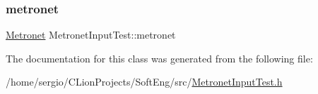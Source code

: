 \subsubsection{\texorpdfstring{metronet}{metronet}}
{\footnotesize\ttfamily \hyperlink{class_metronet}{Metronet} Metronet\+Input\+Test\+::metronet\hspace{0.3cm}{\ttfamily [protected]}}



The documentation for this class was generated from the following file\+:\begin{DoxyCompactItemize}
\item 
/home/sergio/\+C\+Lion\+Projects/\+Soft\+Eng/src/\hyperlink{_metronet_input_test_8h}{Metronet\+Input\+Test.\+h}\end{DoxyCompactItemize}
